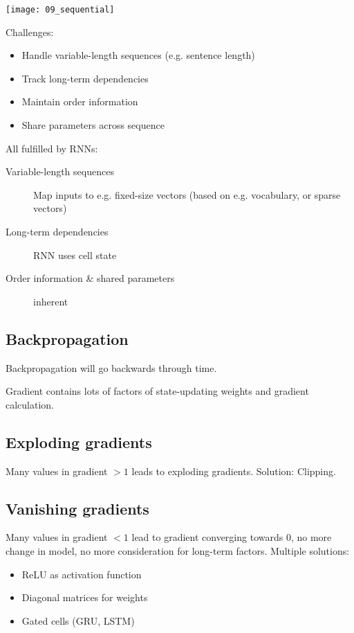 \texttt{[image: 09\_sequential]}

Challenges:
\begin{itemize}
		\item Handle variable-length sequences (e.g. sentence length)
		\item Track long-term dependencies
		\item Maintain order information
		\item Share parameters across sequence
\end{itemize}

All fulfilled by RNNs:
\begin{description}
		\item[Variable-length sequences] Map inputs to e.g. fixed-size vectors
				(based on e.g. vocabulary, or sparse vectors)
		\item[Long-term dependencies] RNN uses cell state
		\item[Order information \& shared parameters] inherent
\end{description}

\subsection{Backpropagation}

Backpropagation will go backwards through time.

Gradient contains lots of factors of state-updating weights and gradient
calculation.

\subsection{Exploding gradients}

Many values in gradient $>1$ leads to exploding gradients. Solution: Clipping.

\subsection{Vanishing gradients}

Many values in gradient $< 1$ lead to gradient converging towards $0$, no more
change in model, no more consideration for long-term factors. Multiple solutions:

\begin{itemize}
		\item ReLU as activation function
		\item Diagonal matrices for weights
		\item Gated cells (GRU, LSTM)
\end{itemize}

